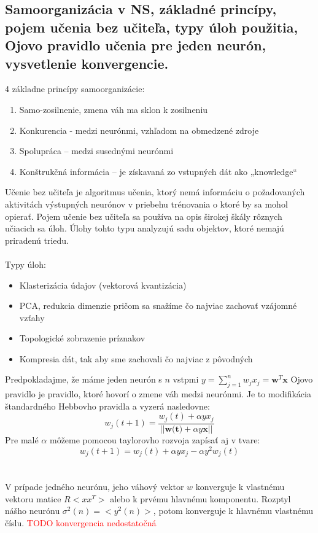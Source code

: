 \documentclass{article}
\numberwithin{equation}{section} %
\begin{document}
\subsection{Samoorganizácia v NS, základné princípy, pojem učenia bez učiteľa, typy úloh použitia, Ojovo pravidlo učenia pre jeden neurón, vysvetlenie konvergencie.}

4 základne princípy samoorganizácie:
\begin{enumerate}
\item Samo-zosilnenie,  zmena váh ma sklon k zosilneniu
\item Konkurencia - medzi neurónmi, vzhľadom na obmedzené zdroje
\item Spolupráca – medzi susednými neurónmi
\item Konštrukčná informácia – je získavaná zo vstupných dát ako „knowledge“
\end{enumerate}
Učenie bez učiteľa je algoritmus učenia, ktorý nemá informáciu o požadovaných aktivitách výstupných neurónov v priebehu trénovania o ktoré by sa mohol opierať. Pojem učenie bez učiteľa sa používa na opis širokej škály rôznych učiacich sa úloh. Úlohy tohto typu analyzujú sadu objektov, ktoré nemajú priradenú triedu.
\\\\
Typy úloh:
\begin{itemize}
\item Klasterizácia údajov (vektorová kvantizácia)
\item PCA, redukcia dimenzie pričom sa snažíme čo najviac zachovať vzájomné vzťahy
\item Topologické zobrazenie príznakov
\item Kompresia dát, tak aby sme zachovali čo najviac z pôvodných
\end{itemize}
Predpokladajme, že máme jeden neurón s $n$ vstpmi $y = \sum_{j=1}^n w_jx_j = \textbf{w}^T\textbf{x}$
Ojovo pravidlo je pravidlo, ktoré hovorí o zmene váh medzi neurónmi. Je to modifikácia štandardného Hebbovho pravidla a vyzerá nasledovne:
$$w_j(t+1) = \frac{w_j(t) + \alpha yx_j}{||\textbf{w(t)} + \alpha y\textbf{x}||}$$
Pre malé $\alpha$ môžeme pomocou taylorovho rozvoja zapísať aj v tvare:
$$w_j(t+1)= w_j(t)+\alpha yx_j - \alpha y^2w_j(t)$$
\\\\
V prípade jedného neurónu, jeho váhový vektor $w$ konverguje k vlastnému vektoru matice $R<xx^T>$ alebo k prvému hlavnému komponentu. Rozptyl nášho neurónu $\sigma^2(n) = <y^2(n)>$, potom konverguje k hlavnému vlastnému číslu.
\textcolor{red}{TODO konvergencia nedostatočná}
\end{document}
